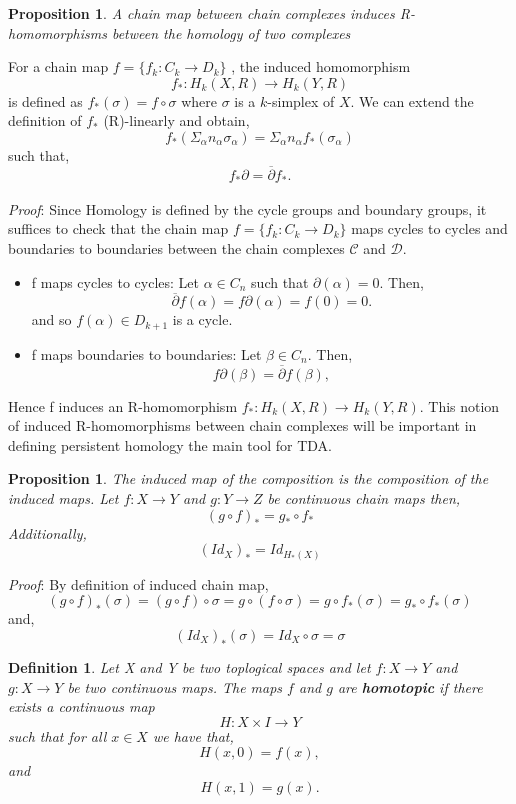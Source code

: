 \documentclass{article}
\newcommand{\be}{\begin{equation}}
\newcommand{\ee}{\end{equation}}
\newtheorem{definition}[theorem]{Definition}
\newtheorem{proposition}[theorem]{Proposition}
\begin{document}
\begin{proposition}\label{chain map induced homo} A chain map between chain complexes induces R-homomorphisms between the homology of two complexes
\end{proposition}
For a chain map $f = \{f_k: C_k \to D_k\}$ , the induced homomorphism 
\be
f_{*}: H_{k}(X,R) \to H_{k}(Y,R)
\ee
is defined as $f_{*} (\sigma) = f \circ \sigma$ where $\sigma$ is a $k$-simplex of $X$. We can extend the definition of $f_{*}$ (R)-linearly and obtain,
\be
f_{*}(\Sigma_\alpha n_\alpha \sigma_\alpha) = \Sigma_\alpha n_\alpha f_{*}(\sigma_\alpha)
\ee
such that,
\be
f_{*}\partial = \overline{\partial}f_{*}.
\ee\\
\textit{Proof}:
Since Homology is defined by the cycle groups and boundary groups, it suffices to check that the chain map $f = \{f_k: C_k \to D_k\}$ maps cycles to cycles and boundaries to boundaries between the chain complexes $\mathcal{C}$ and $\mathcal{D}$.
\begin{itemize}
    \item f maps cycles to cycles: Let $\alpha \in C_n$ such that $\partial(\alpha) = 0$. Then,
    \be
    \overline{\partial}f(\alpha) = f\partial(\alpha) = f(0) = 0.
    \ee and so $f(\alpha) \in D_{k+1}$ is a cycle.

    \item f maps boundaries to boundaries: Let $\beta \in C_n$. Then,
    \be
    f\partial(\beta) = \overline{\partial}f(\beta),
    \ee
\end{itemize}
Hence f induces an R-homomorphism $f_{*}: H_{k}(X,R) \to H_{k}(Y,R)$. This notion of induced R-homomorphisms between chain complexes will be important in defining persistent homology the main tool for TDA. 


\begin{proposition}The induced map of the composition is the composition of the induced maps. Let $f: X \to Y$ and $g:Y\to Z$ be continuous chain maps then,
\be
(g \circ f)_{*} = g_{*} \circ f_{*}
\ee
Additionally,
\be
(Id_{X})_{*} = Id_{H_{*}(X)}
\ee
\end{proposition}
\textit{Proof}: By definition of induced chain map,
\be
(g \circ f)_{*}(\sigma) = (g \circ f) \circ \sigma = g \circ (f \circ \sigma) = g \circ f_{*}(\sigma) = g_{*} \circ f_{*}(\sigma)
\ee and,
\be
(Id_{X})_{*}(\sigma) = Id_{X} \circ \sigma = \sigma
\ee


\begin{definition}Let X and Y be two toplogical spaces and let $f:X\to Y$ and $g:X\to Y$ be two continuous maps. The maps $f$ and $g$ are \textbf{homotopic} if there exists a continuous map
\be
H: X \times I \to Y
\ee such that for all $x \in X$ we have that,
\be
H(x,0) = f(x),
\ee and
\be
H(x,1) = g(x).
\ee
\end{definition}
\end{document}
